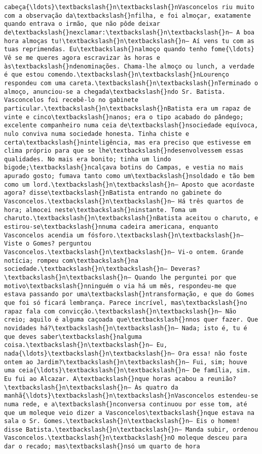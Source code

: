 \documentclass[11pt]{article}
\begin{document}
\begin{Verbatim}[commandchars=\\\{\}]
cabeça{\ldots}\textbackslash{}n\textbackslash{}nVasconcelos riu muito com a observação da\textbackslash{}nfilha, e foi almoçar, exatamente quando entrava o irmão, que não pôde deixar de\textbackslash{}nexclamar:\textbackslash{}n\textbackslash{}n— A boa hora almoças tu!\textbackslash{}n\textbackslash{}n— Aí vens tu com as tuas reprimendas. Eu\textbackslash{}nalmoço quando tenho fome{\ldots} Vê se me queres agora escravizar às horas e às\textbackslash{}ndenominações. Chama-lhe almoço ou lunch, a verdade é que estou comendo.\textbackslash{}n\textbackslash{}nLourenço respondeu com uma careta.\textbackslash{}n\textbackslash{}nTerminado o almoço, anunciou-se a chegada\textbackslash{}ndo Sr. Batista. Vasconcelos foi recebê-lo no gabinete particular.\textbackslash{}n\textbackslash{}nBatista era um rapaz de vinte e cinco\textbackslash{}nanos; era o tipo acabado do pândego; excelente companheiro numa ceia de\textbackslash{}nsociedade equívoca, nulo conviva numa sociedade honesta. Tinha chiste e certa\textbackslash{}ninteligência, mas era preciso que estivesse em clima próprio para que se lhe\textbackslash{}ndesenvolvessem essas qualidades. No mais era bonito; tinha um lindo bigode;\textbackslash{}ncalçava botins do Campas, e vestia no mais apurado gosto; fumava tanto como um\textbackslash{}nsoldado e tão bem como um lord.\textbackslash{}n\textbackslash{}n— Aposto que acordaste agora? disse\textbackslash{}nBatista entrando no gabinete do Vasconcelos.\textbackslash{}n\textbackslash{}n— Há três quartos de hora; almocei neste\textbackslash{}ninstante. Toma um charuto.\textbackslash{}n\textbackslash{}nBatista aceitou o charuto, e estirou-se\textbackslash{}nnuma cadeira americana, enquanto Vasconcelos acendia um fósforo.\textbackslash{}n\textbackslash{}n— Viste o Gomes? perguntou Vasconcelos.\textbackslash{}n\textbackslash{}n— Vi-o ontem. Grande notícia; rompeu com\textbackslash{}na sociedade.\textbackslash{}n\textbackslash{}n— Deveras?\textbackslash{}n\textbackslash{}n— Quando lhe perguntei por que motivo\textbackslash{}nninguém o via há um mês, respondeu-me que estava passando por uma\textbackslash{}ntransformação, e que do Gomes que foi só ficará lembrança. Parece incrível, mas\textbackslash{}no rapaz fala com convicção.\textbackslash{}n\textbackslash{}n— Não creio; aquilo é alguma caçoada que\textbackslash{}nnos quer fazer. Que novidades há?\textbackslash{}n\textbackslash{}n— Nada; isto é, tu é que deves saber\textbackslash{}nalguma coisa.\textbackslash{}n\textbackslash{}n— Eu, nada{\ldots}\textbackslash{}n\textbackslash{}n— Ora essa! não foste ontem ao Jardim?\textbackslash{}n\textbackslash{}n— Fui, sim; houve uma ceia{\ldots}\textbackslash{}n\textbackslash{}n— De família, sim. Eu fui ao Alcazar. A\textbackslash{}nque horas acabou a reunião?\textbackslash{}n\textbackslash{}n— Às quatro da manhã{\ldots}\textbackslash{}n\textbackslash{}nVasconcelos estendeu-se numa rede, e a\textbackslash{}nconversa continuou por esse tom, até que um moleque veio dizer a Vasconcelos\textbackslash{}nque estava na sala o Sr. Gomes.\textbackslash{}n\textbackslash{}n— Eis o homem! disse Batista.\textbackslash{}n\textbackslash{}n— Manda subir, ordenou Vasconcelos.\textbackslash{}n\textbackslash{}nO moleque desceu para dar o recado; mas\textbackslash{}nsó um quarto de hora 
\end{Verbatim}
\end{document}
